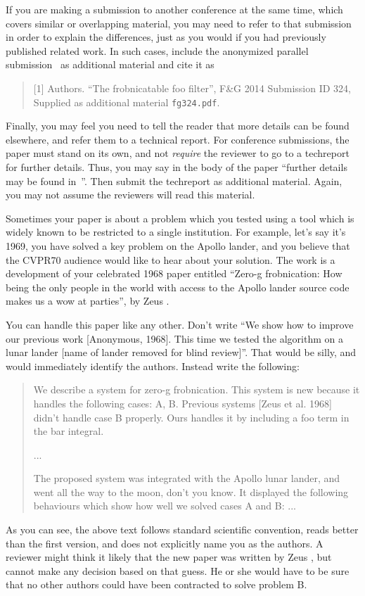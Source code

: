 \documentclass[10pt,twocolumn,letterpaper]{article}
\begin{document}
If you are making a submission to another conference at the same time, which
covers similar or overlapping material, you may need to refer to that submission
in order to explain the differences, just as you would if you had previously
published related work.  In such cases, include the anonymized parallel
submission~\cite{Authors14} as additional material and cite it as
\begin{quote}
[1] Authors. ``The frobnicatable foo filter'', F\&G 2014 Submission ID 324,
Supplied as additional material {\tt fg324.pdf}.
\end{quote}

Finally, you may feel you need to tell the reader that more details can be found
elsewhere, and refer them to a technical report.  For conference submissions,
the paper must stand on its own, and not {\em require} the reviewer to go to a
techreport for further details.  Thus, you may say in the body of the paper
``further details may be found in~\cite{Authors14b}''.  Then submit the
techreport as additional material. Again, you may not assume the reviewers will
read this material.

Sometimes your paper is about a problem which you tested using a tool which is
widely known to be restricted to a single institution.  For example, let's say
it's 1969, you have solved a key problem on the Apollo lander, and you believe
that the CVPR70 audience would like to hear about your solution.  The work is a
development of your celebrated 1968 paper entitled ``Zero-g frobnication: How
being the only people in the world with access to the Apollo lander source code
makes us a wow at parties'', by Zeus \etal.

You can handle this paper like any other.  Don't write ``We show how to improve
our previous work [Anonymous, 1968].  This time we tested the algorithm on a
lunar lander [name of lander removed for blind review]''. That would be silly,
and would immediately identify the authors. Instead write the following:
\begin{quotation}
\noindent
   We describe a system for zero-g frobnication.  This system is new because it
   handles the following cases: A, B.  Previous systems [Zeus et al. 1968]
   didn't handle case B properly.  Ours handles it by including a foo term in
   the bar integral.

   ...

   The proposed system was integrated with the Apollo lunar lander, and went all
   the way to the moon, don't you know.  It displayed the following behaviours
   which show how well we solved cases A and B: ...
\end{quotation}
As you can see, the above text follows standard scientific convention, reads
better than the first version, and does not explicitly name you as the authors.
A reviewer might think it likely that the new paper was written by Zeus \etal,
but cannot make any decision based on that guess. He or she would have to be
sure that no other authors could have been contracted to solve problem B.
\medskip
\end{document}
